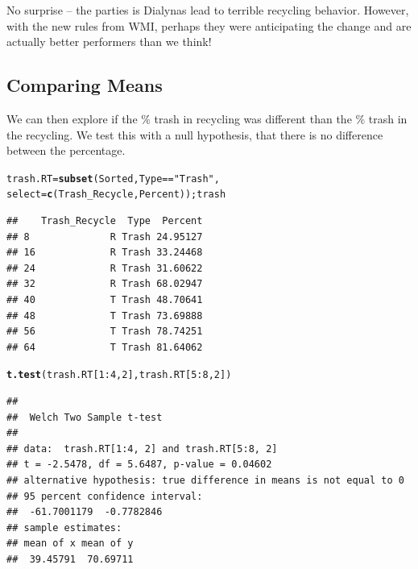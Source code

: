 \documentclass{tufte-handout}\usepackage[]{graphicx}\usepackage[]{color}
\makeatletter
\newcommand{\hlnum}[1]{\textcolor[rgb]{0.686,0.059,0.569}{#1}}%
\newcommand{\hlstr}[1]{\textcolor[rgb]{0.192,0.494,0.8}{#1}}%
\newcommand{\hlopt}[1]{\textcolor[rgb]{0,0,0}{#1}}%
\newcommand{\hlstd}[1]{\textcolor[rgb]{0.345,0.345,0.345}{#1}}%
\newcommand{\hlkwb}[1]{\textcolor[rgb]{0.69,0.353,0.396}{#1}}%
\newcommand{\hlkwc}[1]{\textcolor[rgb]{0.333,0.667,0.333}{#1}}%
\newcommand{\hlkwd}[1]{\textcolor[rgb]{0.737,0.353,0.396}{\textbf{#1}}}%
\newenvironment{kframe}{%
 \def\at@end@of@kframe{}%
 \ifinner\ifhmode%
  \def\at@end@of@kframe{\end{minipage}}%
  \begin{minipage}{\columnwidth}%
 \fi\fi%
 \def\FrameCommand##1{\hskip\@totalleftmargin \hskip-\fboxsep
 \colorbox{shadecolor}{##1}\hskip-\fboxsep
     \hskip-\linewidth \hskip-\@totalleftmargin \hskip\columnwidth}%
 \MakeFramed {\advance\hsize-\width
   \@totalleftmargin\z@ \linewidth\hsize
   \@setminipage}}%
 {\par\unskip\endMakeFramed%
 \at@end@of@kframe}
\newenvironment{knitrout}{}{} %
\makeatother
\begin{document}
No surprise -- the parties is Dialynas lead to terrible recycling behavior. However, with the new rules from WMI, perhaps they were anticipating the change and are actually better performers than we think! 

\subsection{Comparing Means}

We can then explore if the \% trash in recycling was different than the \% trash in the recycling. We test this with a null hypothesis, that there is no difference between the percentage.

\begin{knitrout}
\color{fgcolor}\begin{kframe}
\begin{alltt}
\hlstd{trash.RT} \hlkwb{=} \hlkwd{subset}\hlstd{(Sorted, Type} \hlopt{==} \hlstr{"Trash"}\hlstd{,}
            \hlkwc{select} \hlstd{=} \hlkwd{c}\hlstd{(Trash_Recycle, Percent)); trash}
\end{alltt}
\begin{verbatim}
##    Trash_Recycle  Type  Percent
## 8              R Trash 24.95127
## 16             R Trash 33.24468
## 24             R Trash 31.60622
## 32             R Trash 68.02947
## 40             T Trash 48.70641
## 48             T Trash 73.69888
## 56             T Trash 78.74251
## 64             T Trash 81.64062
\end{verbatim}
\begin{alltt}
\hlkwd{t.test}\hlstd{(trash.RT[}\hlnum{1}\hlopt{:}\hlnum{4}\hlstd{,}\hlnum{2}\hlstd{], trash.RT[}\hlnum{5}\hlopt{:}\hlnum{8}\hlstd{,}\hlnum{2}\hlstd{])}
\end{alltt}
\begin{verbatim}
## 
## 	Welch Two Sample t-test
## 
## data:  trash.RT[1:4, 2] and trash.RT[5:8, 2]
## t = -2.5478, df = 5.6487, p-value = 0.04602
## alternative hypothesis: true difference in means is not equal to 0
## 95 percent confidence interval:
##  -61.7001179  -0.7782846
## sample estimates:
## mean of x mean of y 
##  39.45791  70.69711
\end{verbatim}
\end{kframe}
\end{knitrout}
\end{document}
